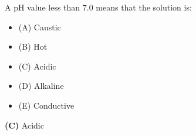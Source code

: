 

A pH value less than 7.0 means that the solution is:

\begin{itemize}
\item{(A)} Caustic
\vskip 5pt 
\item{(B)} Hot
\vskip 5pt 
\item{(C)} Acidic
\vskip 5pt 
\item{(D)} Alkaline
\vskip 5pt 
\item{(E)} Conductive
\end{itemize}







{\bf (C)} Acidic
 









